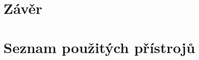 \documentclass{protokol}
\begin{document}
\section{Závěr}
    \cite{navod}

\pagebreak


\section{Seznam použitých přístrojů}

\pagebreak









\end{document}
